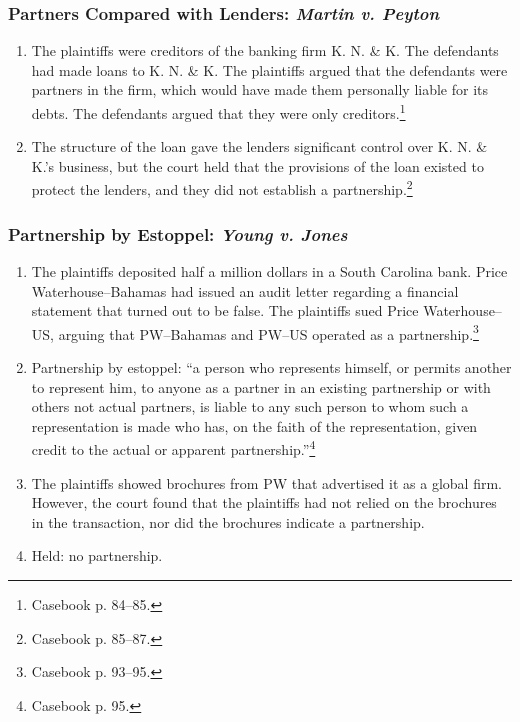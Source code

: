 \subsubsection{Partners Compared with Lenders: \emph{Martin v. Peyton}}
\begin{enumerate}
    \item The plaintiffs were creditors of the banking firm K. N. \& K. The 
    defendants had made loans to K. N. \& K. The plaintiffs argued that the 
    defendants were partners in the firm, which would have made them 
    personally liable for its debts. The defendants argued that they were only 
    creditors.\footnote{Casebook p. 84--85.}
    \item The structure of the loan gave the lenders significant control over 
    K. N. \& K.'s business, but the court held that the provisions of the loan 
    existed to protect the lenders, and they did not establish a 
    partnership.\footnote{Casebook p. 85--87.}
\end{enumerate}

\subsubsection{Partnership by Estoppel: \emph{Young v. Jones}}
\begin{enumerate}
    \item The plaintiffs deposited half a million dollars in a South Carolina 
    bank. Price Waterhouse--Bahamas had issued an audit letter regarding a 
    financial statement that turned out to be false. The plaintiffs sued Price 
    Waterhouse--US, arguing that PW--Bahamas and PW--US operated as a 
    partnership.\footnote{Casebook p. 93--95.}
    \item Partnership by estoppel: ``a person who represents himself, or 
    permits another to represent him, to anyone as a partner in an existing 
    partnership or with others not actual partners, is liable to any such 
    person to whom such a representation is made who has, on the faith of the 
    representation, given credit to the actual or apparent 
    partnership.''\footnote{Casebook p. 95.}
    \item The plaintiffs showed brochures from PW that advertised it as a 
    global firm. However, the court found that the plaintiffs had not relied 
    on the brochures in the transaction, nor did the brochures indicate a 
    partnership.
    \item Held: no partnership.
\end{enumerate}

